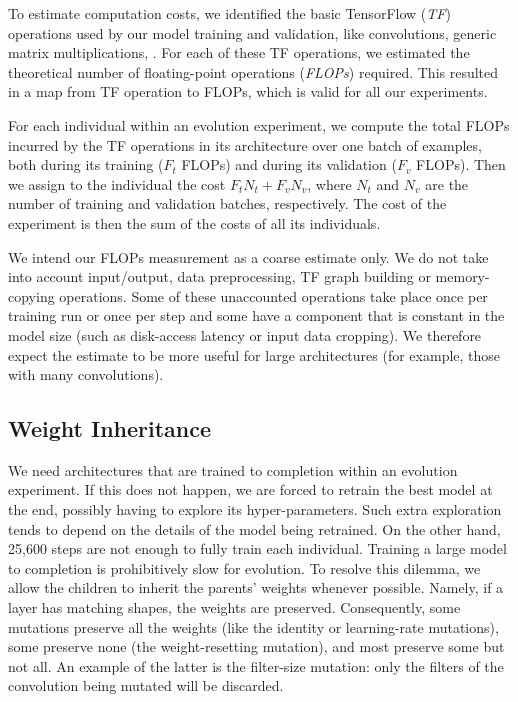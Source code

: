 \documentclass{article}
\begin{document}
To estimate computation costs, we identified the basic TensorFlow ({\em TF}) operations used by our model training and validation, like convolutions, generic matrix multiplications, \etc. For each of these TF operations, we estimated the theoretical number of floating-point operations ({\em FLOPs}) required. This resulted in a map from TF operation to FLOPs, which is valid for all our experiments.

For each individual within an evolution experiment, we compute the total FLOPs incurred by the TF operations in its architecture over one batch of examples, both during its training ($F_t$ FLOPs) and during its validation ($F_v$ FLOPs). Then we assign to the individual the cost $F_t N_t + F_v N_v$, where $N_t$ and $N_v$ are the number of training and validation batches, respectively. The cost of the experiment is then the sum of the costs of all its individuals.

We intend our FLOPs measurement as a coarse estimate only. We do not take into account input/output, data preprocessing, TF graph building or memory-copying operations. Some of these unaccounted operations take place once per training run or once per step and some have a component that is constant in the model size (such as disk-access latency or input data cropping). We therefore expect the estimate to be more useful for large architectures (for example, those with many convolutions).


\subsection{Weight Inheritance}
\label{weight_inheritance_section}

We need architectures that are trained to completion within an evolution experiment. If this does not happen, we are forced to retrain the best model at the end, possibly having to explore its hyper-parameters. Such extra exploration tends to depend on the details of the model being retrained. On the other hand, 25,600 steps are not enough to fully train each individual. Training a large model to completion is prohibitively slow for evolution. To resolve this dilemma, we allow the children to inherit the parents' weights whenever possible. Namely, if a layer has matching shapes, the weights are preserved. Consequently, some mutations preserve all the weights (like the identity or learning-rate mutations), some preserve none (the weight-resetting mutation), and most preserve some but not all. An example of the latter is the filter-size mutation: only the filters of the convolution being mutated will be discarded.
\end{document}
